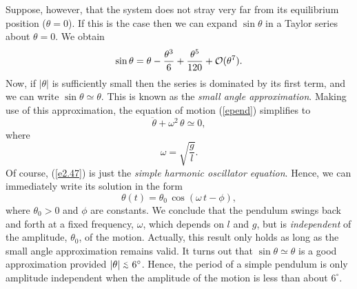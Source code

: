 Suppose, however,  that the system does not stray very far from
its equilibrium position ($\theta=0$). If this is the case then we
can expand $\sin\theta$ in a Taylor series about $\theta=0$. We obtain
\begin{equation}
\sin\theta = \theta - \frac{\theta^3}{6} + \frac{\theta^5}{120} + {\cal O}(\theta^7).
\end{equation}
Now, if $|\theta|$ is sufficiently small then the series is dominated by its
first term, and we can write $\sin\theta\simeq \theta$. This is known
as the {\em small angle approximation}.
Making use of this approximation, 
the  equation of motion (\ref{epend}) simplifies to
\begin{equation}\label{e2.47}
\ddot{\theta} +\omega^2\,\theta\simeq 0,
\end{equation}
where 
\begin{equation}
\omega = \sqrt{\frac{g}{l}}.
\end{equation}
 Of course, (\ref{e2.47}) is just the
{\em simple harmonic oscillator equation}. Hence, we can immediately write its solution
in the form
\begin{equation}\label{e4.64}
\theta(t) = \theta_0\,\cos(\omega\,t-\phi),
\end{equation}
where $\theta_0>0$ and $\phi$ are constants. 
We conclude that the pendulum swings back and forth at a fixed frequency, $\omega$, which depends on $l$ and $g$, but is {\em independent}\/ of the amplitude,
$\theta_0$, of the motion. Actually, this result only holds as long as
the small angle approximation remains valid. It turns out that $\sin\theta\simeq \theta$
is a good approximation provided  $|\theta|\stackrel {_{\normalsize<}}{_{\normalsize \sim}} 6^\circ$. Hence, the period
of a simple pendulum is only amplitude independent when the amplitude of the motion
is less than about $6^\circ$. 

